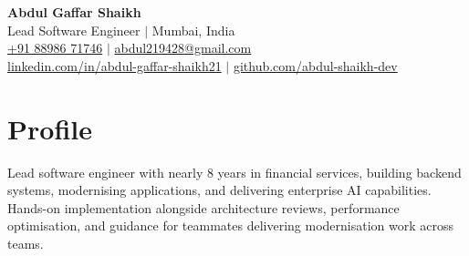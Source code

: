 \documentclass[letterpaper,11pt]{article}
\begin{document}
\begin{center}
    \textbf{\Huge Abdul Gaffar Shaikh} \\ \vspace{4pt}
    \small Lead Software Engineer $|$ Mumbai, India \\
    \href{tel:+918898671746}{+91 88986 71746} $|$
    \href{mailto:abdul219428@gmail.com}{abdul219428@gmail.com} \\
    \href{https://www.linkedin.com/in/abdul-gaffar-shaikh21/}{linkedin.com/in/abdul-gaffar-shaikh21} $|$
    \href{https://github.com/abdul-shaikh-dev}{github.com/abdul-shaikh-dev}
\end{center}
\setlength{\footskip}{12pt}

\section{Profile}
\small{Lead software engineer with nearly 8 years in financial services, building backend systems, modernising applications, and delivering enterprise AI capabilities. Hands-on implementation alongside architecture reviews, performance optimisation, and guidance for teammates delivering modernisation work across teams.}
\end{document}
